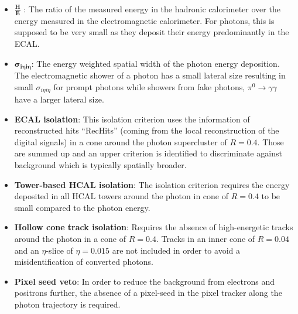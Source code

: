 \begin{itemize}
 \item $\frac{\textbf{H}}{\textbf{E}}$ : The ratio of the measured energy in the hadronic calorimeter over the energy measured in the electromagnetic calorimeter. 
                                                    For photons, this is supposed to be very small as they deposit their energy predominantly in the ECAL.
 \item $\mathbold{\sigma_{i\eta i \eta}}$: The energy weighted spatial width of the photon energy deposition. The electromagnetic shower of a photon has a small lateral size 
                                           resulting in small $\sigma_{i\eta i \eta}$ for prompt photons while showers from fake photons, \eg $\pi^{0} \rightarrow \gamma \gamma$
                                           have a larger lateral size.
 \item \textbf{ECAL isolation}: This isolation criterion uses the information of reconstructed hits ``RecHits'' (coming from the local reconstruction of the digital signals) 
                                in a cone around the photon supercluster of $R=0.4$. Those are summed up and an upper criterion is identified to discriminate against 
                                background which is typically spatially broader.  
 \item \textbf{Tower-based HCAL isolation}: The isolation criterion requires the energy deposited in all HCAL towers around the photon in cone of $R=0.4$ to be small compared to the photon energy. 
 \item \textbf{Hollow cone track isolation}: Requires the absence of high-energetic tracks around the photon in a cone of $R=0.4$. Tracks in an inner cone of $R=0.04$ and an $\eta$-slice of $\eta=0.015$ are not included in order to avoid a misidentification of converted photons.
 \item \textbf{Pixel seed veto}: In order to reduce the background from electrons and positrons further, the absence of a pixel-seed in the pixel tracker along the photon trajectory is required.
\end{itemize}


